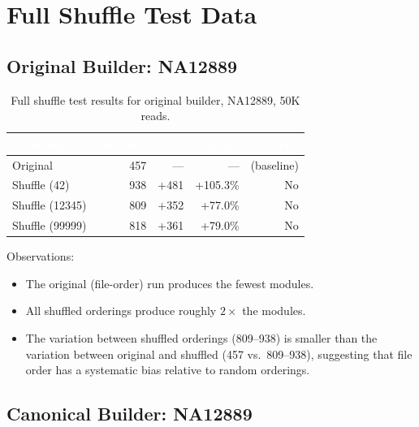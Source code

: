 \documentclass{../yalumba}
\begin{document}
\appendix

\section{Full Shuffle Test Data}
\label{app:shuffle}

\subsection{Original Builder: NA12889}

\begin{table}[H]
\centering
\caption{Full shuffle test results for original builder, NA12889, 50K reads.}
\label{tab:app-old-full}
\begin{tabular}{lrrrr}
\toprule
\rowcolor{table-header}
\textcolor{white}{\textbf{Ordering}} & \textcolor{white}{\textbf{Modules}} & \textcolor{white}{$\Delta$} & \textcolor{white}{\textbf{Change}} & \textcolor{white}{\textbf{Match?}} \\
\midrule
Original           & 457  & ---    & ---      & (baseline) \\
Shuffle (42)       & 938  & +481   & +105.3\% & No \\
Shuffle (12345)    & 809  & +352   & +77.0\%  & No \\
Shuffle (99999)    & 818  & +361   & +79.0\%  & No \\
\bottomrule
\end{tabular}
\end{table}

\noindent
Observations:
\begin{itemize}[leftmargin=2em]
  \item The original (file-order) run produces the fewest modules.
  \item All shuffled orderings produce roughly $2\times$ the modules.
  \item The variation between shuffled orderings (809--938) is smaller than the
    variation between original and shuffled (457 vs.\ 809--938), suggesting that
    file order has a systematic bias relative to random orderings.
\end{itemize}

\subsection{Canonical Builder: NA12889}
\end{document}
